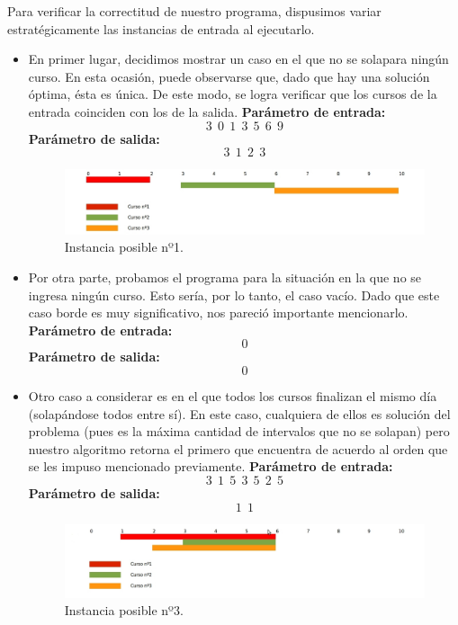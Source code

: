 Para verificar la correctitud de nuestro programa, dispusimos variar estratégicamente las instancias de entrada al ejecutarlo.
\begin{itemize}
\item En primer lugar, decidimos mostrar un caso en el que no se solapara ningún curso. En esta ocasión, puede observarse que, dado que hay una solución óptima, ésta es única. De este modo, se logra verificar que los cursos de la entrada coinciden con los de la salida.\newline
\textbf{Parámetro de entrada:} $$3\ \ 0\ \ 1\ \ 3\ \ 5\ \ 6\ \ 9$$
\textbf{Parámetro de salida:} $$3\ \ 1\ \ 2\ \ 3$$\newline


\begin{figure}[H] %
\begin{center}
\includegraphics[width=450pt]{../imgs/instancia4.jpg}
\end{center}
\caption{Instancia posible nº1.}
\end{figure}

\item Por otra parte, probamos el programa para la situación en la que no se ingresa ningún curso. Esto sería, por lo tanto, el caso vacío. Dado que este caso borde es muy significativo, nos pareció importante mencionarlo.\newline
\textbf{Parámetro de entrada:} $$0$$
\textbf{Parámetro de salida:} $$0$$ \newline


\item Otro caso a considerar es en el que todos los cursos finalizan el mismo día (solapándose todos entre sí). En este caso, cualquiera de ellos es solución del problema (pues es la máxima cantidad de intervalos que no se solapan) pero nuestro algoritmo retorna el primero que encuentra de acuerdo al orden que se les impuso mencionado previamente. \newline
\textbf{Parámetro de entrada:}  $$3\ \ 1\ \ 5\ \ 3\ \ 5\ \ 2\ \ 5$$
\textbf{Parámetro de salida:}  $$1\ \ 1$$\newline

\begin{figure}[H] %
\begin{center}
\includegraphics[width=450pt]{../imgs/instancia3.jpg}
\end{center}
\caption{Instancia posible nº3.}
\end{figure}



\end{itemize}
